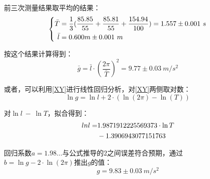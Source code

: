 \documentclass[a4paper]{ltxdoc}
\begin{document}
\begin{multicols}{2}
  前三次测量结果取平均的结果：
  \begin{equation}
    \left\{
    \begin{aligned}
      \bar T & = \frac 1 3(\frac{85.85}{55}+\frac{85.81}{55}+\frac{154.94}{100})=1.557 \pm 0.001\ s \\
      \bar l & = 0.600 m \pm  0.001\ m                                                              \\
    \end{aligned}
    \notag
    \right.
  \end{equation}

  按这个结果计算得到：
  $$\bar g=\bar l\cdot (\frac {2\pi} {\bar T})^2=9.77\pm 0.03\ m/s^2$$

  或者，可以利用\eqref{XY}进行线性回归分析，对\eqref{XY}两侧取对数：
  \begin{equation}
    \ln g = \ln l + 2\cdot(\ln(2\pi) -\ln(T))
  \end{equation}

  对$\ln l\ -\ \ln T$，拟合得到：
  \begin{equation}
    \begin{aligned}
      ln l= & 1.9871912225569373\cdot \ln T \\
            & -1.3906943077151763           \\
    \end{aligned}
    \notag{}
  \end{equation}

  回归系数$a=1.98\ldots$与公式推导的$2$之间误差符合预期，通过$b=\ln g -2\cdot \ln(2\pi)$推出$g$的值：
  \begin{equation}
    g = 9.83\pm 0.03\ m/s^2
  \end{equation}
  
  \theendnotes
\end{multicols}
\end{document}
